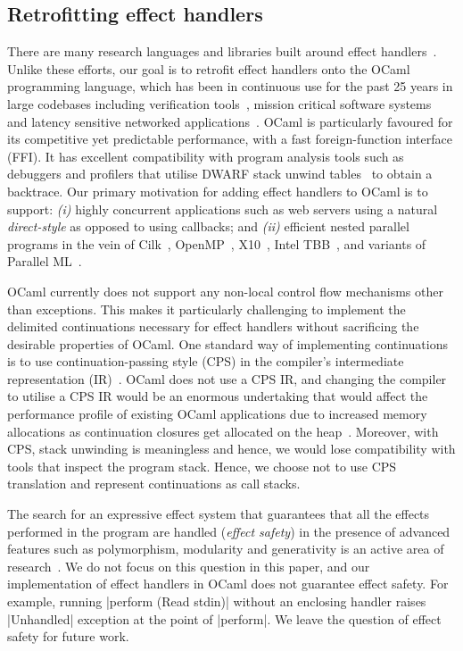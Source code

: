 \documentclass[sigplan,10pt,review,anonymous]{acmart}\settopmatter{printfolios=true,printccs=false,printacmref=false}
\begin{document}
\subsection{Retrofitting effect handlers}

There are many research languages and libraries built around effect
handlers~\cite{Leijen14,Hillerstrom20,Pyro,Frank,Eff}. Unlike these efforts, our
goal is to retrofit effect handlers onto the OCaml programming language, which
has been in continuous use for the past 25 years in large codebases including
verification tools~\cite{everest,Coq}, mission critical software
systems~\cite{astree} and latency sensitive networked
applications~\cite{Madhavapeddy13}. OCaml is particularly favoured for its
competitive yet predictable performance, with a fast foreign-function interface
(FFI). It has excellent compatibility with program analysis tools such as debuggers
and profilers that utilise DWARF stack unwind tables~\cite{DWARF} to obtain a
backtrace. Our primary motivation for adding effect handlers to OCaml is to
support: {\em (i)} highly concurrent applications such as web servers using a
natural \emph{direct-style} as opposed to using callbacks; and {\em (ii)} efficient
nested parallel programs in the vein of Cilk~\cite{Cilk}, OpenMP~\cite{OpenMP},
X10~\cite{Charles05}, Intel TBB~\cite{IntelTBB}, and variants of Parallel
ML~\cite{MaPLe, Fluet10, Sivaramakrishnan14}.

OCaml currently does not support any non-local control flow mechanisms other
than exceptions. This makes it particularly challenging to implement the
delimited continuations necessary for effect handlers without sacrificing the
desirable properties of OCaml. One standard way of implementing continuations
is to use continuation-passing style (CPS) in the compiler's intermediate
representation (IR)~\cite{Leijen14}. OCaml does not use a CPS IR, and changing
the compiler to utilise a CPS IR would be an enormous undertaking that would
affect the performance profile of existing OCaml applications due to increased
memory allocations as continuation closures get allocated on the
heap~\cite{Farvardin20}. Moreover, with CPS, stack unwinding is meaningless and
hence, we would lose compatibility with tools that inspect the program stack.
Hence, we choose not to use CPS translation and represent continuations as call
stacks.

The search for an expressive effect system that guarantees that all the effects
performed in the program are handled (\emph{effect safety}) in the presence of
advanced features such as polymorphism, modularity and generativity is an
active area of research~\cite{Leijen14, Biernacki19, Biernacki20,
Hillerstrom20}. We do not focus on this question in this paper, and our
implementation of effect handlers in OCaml does not guarantee effect safety.
For example, running |perform (Read stdin)| without an enclosing handler raises
|Unhandled| exception at the point of |perform|. We leave the question of
effect safety for future work.
\end{document}
